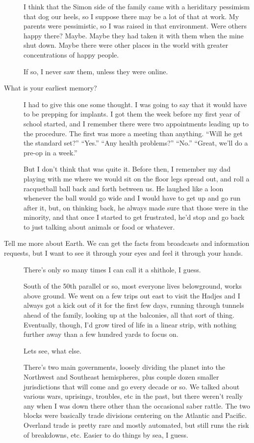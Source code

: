 \begin{description}
I think that the Simon side of the family came with a heriditary pessimism that dog our heels, so I suppose there may be a lot of that at work. My parents were pessimistic, so I was raised in that environment. Were others happy there? Maybe. Maybe they had taken it with them when the mine shut down. Maybe there were other places in the world with greater concentrations of happy people.

If so, I never saw them, unless they were online.
\item[What is your earliest memory?]
I had to give this one some thought. I was going to say that it would have to be prepping for implants. I got them the week before my first year of school started, and I remember there were two appointments leading up to the procedure. The first was more a meeting than anything. ``Will he get the standard set?'' ``Yes.'' ``Any health problems?'' ``No.'' ``Great, we'll do a pre-op in a week.''

But I don't think that was quite it. Before then, I remember my dad playing with me where we would sit on the floor legs spread out, and roll a racquetball ball back and forth between us. He laughed like a loon whenever the ball would go wide and I would have to get up and go run after it, but, on thinking back, he always made sure that those were in the minority, and that once I started to get frustrated, he'd stop and go back to just talking about animals or food or whatever.
\item[Tell me more about Earth. We can get the facts from broadcasts and information requests, but I want to see it through your eyes and feel it through your hands.]
There's only so many times I can call it a shithole, I guess.

South of the 50th parallel or so, most everyone lives belowground, works above ground. We went on a few trips out east to visit the Hadjes and I always got a kick out of it for the first few days, running through tunnels ahead of the family, looking up at the balconies, all that sort of thing. Eventually, though, I'd grow tired of life in a linear strip, with nothing further away than a few hundred yards to focus on.

Lets see, what else.

There's two main governments, loosely dividing the planet into the Northwest and Southeast hemispheres, plus couple dozen smaller jurisdictions that will come and go every decade or so. We talked about various wars, uprisings, troubles, etc in the past, but there weren't really any when I was down there other than the occasional saber rattle. The two blocks were basically trade divisions centering on the Atlantic and Pacific. Overland trade is pretty rare and mostly automated, but still runs the risk of breakdowns, etc. Easier to do things by sea, I guess.


\end{description}
